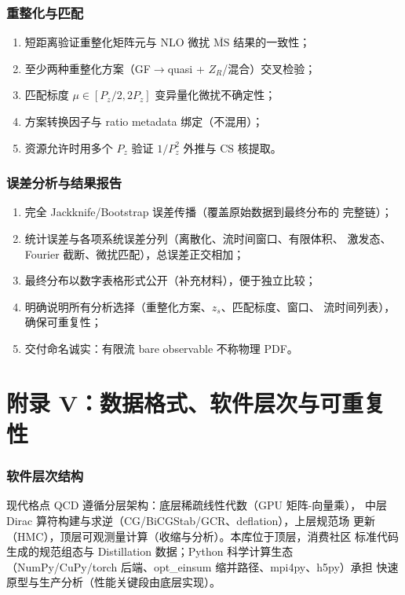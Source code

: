 \documentclass[11pt,a4paper]{ctexart}
\newcommand{\MSbarM}{\overline{\text{MS}}}
\begin{document}
\subsubsection{重整化与匹配}

\begin{enumerate}
  \item 短距离验证重整化矩阵元与 NLO 微扰 $\MSbarM$ 结果的一致性；
  \item 至少两种重整化方案（GF$\to$quasi + $Z_R$/混合）交叉检验；
  \item 匹配标度 $\mu\in[P_z/2,2P_z]$ 变异量化微扰不确定性；
  \item 方案转换因子与 ratio metadata 绑定（不混用）；
  \item 资源允许时用多个 $P_z$ 验证 $1/P_z^2$ 外推与 CS 核提取。
\end{enumerate}

\subsubsection{误差分析与结果报告}

\begin{enumerate}
  \item 完全 Jackknife/Bootstrap 误差传播（覆盖原始数据到最终分布的
  完整链）；
  \item 统计误差与各项系统误差分列（离散化、流时间窗口、有限体积、
  激发态、Fourier 截断、微扰匹配），总误差正交相加；
  \item 最终分布以数字表格形式公开（补充材料），便于独立比较；
  \item 明确说明所有分析选择（重整化方案、$z_s$、匹配标度、窗口、
  流时间列表），确保可重复性；
  \item 交付命名诚实：有限流 bare observable 不称物理 PDF。
\end{enumerate}

\section{附录 V：数据格式、软件层次与可重复性}

\subsubsection{软件层次结构}

现代格点 QCD 遵循分层架构：底层稀疏线性代数（GPU 矩阵-向量乘），
中层 Dirac 算符构建与求逆（CG/BiCGStab/GCR、deflation），上层规范场
更新（HMC），顶层可观测量计算（收缩与分析）。本库位于顶层，消费社区
标准代码生成的规范组态与 Distillation 数据；Python 科学计算生态
（NumPy/CuPy/torch 后端、opt\_einsum 缩并路径、mpi4py、h5py）承担
快速原型与生产分析（性能关键段由底层实现）。
\end{document}
